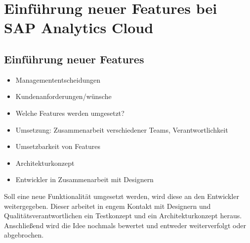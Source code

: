 \section{Einführung neuer Features bei SAP Analytics Cloud}\label{sec:feature}

\subsection{Einführung neuer Features}
\begin{itemize}
    \item Managemententscheidungen
    \item Kundenanforderungen/wünsche
    \item Welche Features werden umgesetzt?
    \item Umsetzung: Zusammenarbeit verschiedener Teams, Verantwortlichkeit
    \item Umsetzbarkeit von Features
    \item Architekturkonzept
    \item Entwickler in Zusammenarbeit mit Designern
\end{itemize}

Soll eine neue Funktionalität umgesetzt werden, wird diese an den Entwickler weitergegeben. Dieser 
arbeitet in engem Kontakt mit Designern und Qualitätsverantwortlichen ein Testkonzept und ein Architekturkonzept heraus. 
Anschließend wird die Idee nochmals bewertet und entweder weiterverfolgt oder abgebrochen. 
